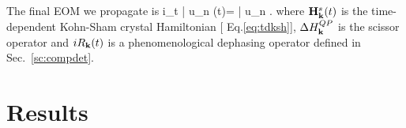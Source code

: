 %   
%
The final EOM we propagate is 
\be
i\partial_t | u_{n\kk} (t)\rangle =
     | u_{n\kk}  \rangle \label{eq:def1} .
\ee
where ${\bf H}^{s}_{\bf k}(t)$ is the time-dependent Kohn-Sham crystal Hamiltonian [ Eq.\ref{eq:tdksh}], $\Delta H^{QP}_{\bf k}$ is the scissor operator and $i R_{\bf k}(t)$ is a phenomenological dephasing operator defined in Sec.~\ref{sc:compdet}.

%
%
%



\section{Results} \label{rt-tddft}

